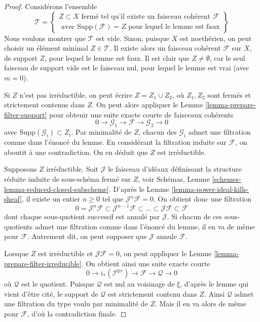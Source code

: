 \begin{proof}
Considérons l'ensemble
$$
\mathcal{T} =
\left\{
\begin{matrix}
Z \subset X
\text{ fermé tel qu'il existe un faisceau cohérent }
\mathcal{F} \\
\text{ avec }
\text{Supp}(\mathcal{F}) = Z
\text{ pour lequel le lemme est faux}
\end{matrix}
\right\}
$$
Nous voulons montrer que $\mathcal{T}$ est vide. Sinon,
puisque $X$ est noethérien, on peut choisir un élément minimal
$Z \in \mathcal{T}$. Il existe alors un faisceau cohérent
$\mathcal{F}$ sur $X$, de support $Z$, pour lequel le
lemme est faux. Il est clair que $Z \not = \emptyset$, car le seul
faisceau de support vide est le faisceau nul, pour lequel le
lemme est vrai (avec $m = 0$).

\medskip\noindent
Si $Z$ n'est pas irréductible, on peut écrire $Z = Z_1 \cup Z_2$,
où $Z_1, Z_2$ sont fermés et strictement contenus dans $Z$.
On peut alors appliquer le Lemme \ref{lemma-prepare-filter-support}
pour obtenir une suite exacte courte de faisceaux cohérents
$$
0 \to
\mathcal{G}_1 \to
\mathcal{F} \to
\mathcal{G}_2 \to 0
$$
avec $\text{Supp}(\mathcal{G}_i) \subset Z_i$. Par minimalité de
$Z$, chacun des $\mathcal{G}_i$ admet une filtration comme dans l'énoncé
du lemme. En considérant la filtration induite sur $\mathcal{F}$,
on aboutit à une contradiction. On en déduit
que $Z$ est irréductible.

\medskip\noindent
Supposons $Z$ irréductible. Soit $\mathcal{J}$ le faisceau d'idéaux
définissant la structure réduite induite de sous-schéma fermé sur $Z$,
voir Schémas, Lemme \ref{schemes-lemma-reduced-closed-subscheme}.
D'après le Lemme \ref{lemma-power-ideal-kills-sheaf}, il existe
un entier $n \geq 0$ tel que $\mathcal{J}^n\mathcal{F} = 0$. On obtient donc
une filtration
$$
0 = \mathcal{J}^n\mathcal{F} \subset \mathcal{J}^{n - 1}\mathcal{F}
\subset \ldots \subset \mathcal{J}\mathcal{F} \subset \mathcal{F}
$$
dont chaque sous-quotient successif est annulé par $\mathcal{J}$.
Si chacun de ces sous-quotients admet une filtration comme dans l'énoncé
du lemme, il en va de même pour $\mathcal{F}$. Autrement dit, on peut
supposer que $\mathcal{J}$ annule $\mathcal{F}$.

\medskip\noindent
Lorsque $Z$ est irréductible et $\mathcal{J}\mathcal{F} = 0$,
on peut appliquer le Lemme \ref{lemma-prepare-filter-irreducible}.
On obtient ainsi une suite exacte courte
$$
0 \to
i_*(\mathcal{I}^{\oplus r}) \to
\mathcal{F} \to
\mathcal{Q} \to 0
$$
où $\mathcal{Q}$ est le quotient.
Puisque $\mathcal{Q}$ est nul au voisinage de $\xi$, d'après
le lemme qui vient d'être cité, le support de $\mathcal{Q}$
est strictement contenu dans $Z$. Ainsi $\mathcal{Q}$
admet une filtration du type voulu par minimalité de $Z$.
Mais il en va alors de même pour $\mathcal{F}$, d'où la contradiction finale.
\end{proof}


